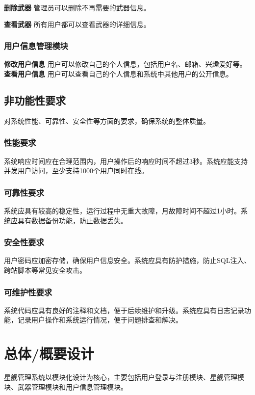 \documentclass{base}
\begin{document}
\textbf{删除武器} 管理员可以删除不再需要的武器信息。

\textbf{查看武器} 所有用户都可以查看武器的详细信息。

\subsubsection{用户信息管理模块}

\textbf{修改用户信息} 用户可以修改自己的个人信息，包括用户名、邮箱、兴趣爱好等。
\textbf{查看用户信息} 用户可以查看自己的个人信息和系统中其他用户的公开信息。

\subsection{非功能性要求}

对系统性能、可靠性、安全性等方面的要求，确保系统的整体质量。

\subsubsection{性能要求}
系统响应时间应在合理范围内，用户操作后的响应时间不超过3秒。系统应能支持并发用户访问，至少支持1000个用户同时在线。

\subsubsection{可靠性要求}

系统应具有较高的稳定性，运行过程中无重大故障，月故障时间不超过1小时。系统应具有数据备份功能，防止数据丢失。

\subsubsection{安全性要求}
用户密码应加密存储，确保用户信息安全。系统应具有防护措施，防止SQL注入、跨站脚本等常见安全攻击。

\subsubsection{可维护性要求}
系统代码应具有良好的注释和文档，便于后续维护和升级。系统应具有日志记录功能，记录用户操作和系统运行情况，便于问题排查和解决。

\section{总体/概要设计}

星舰管理系统以模块化设计为核心，主要包括用户登录与注册模块、星舰管理模块、武器管理模块和用户信息管理模块。
\end{document}
